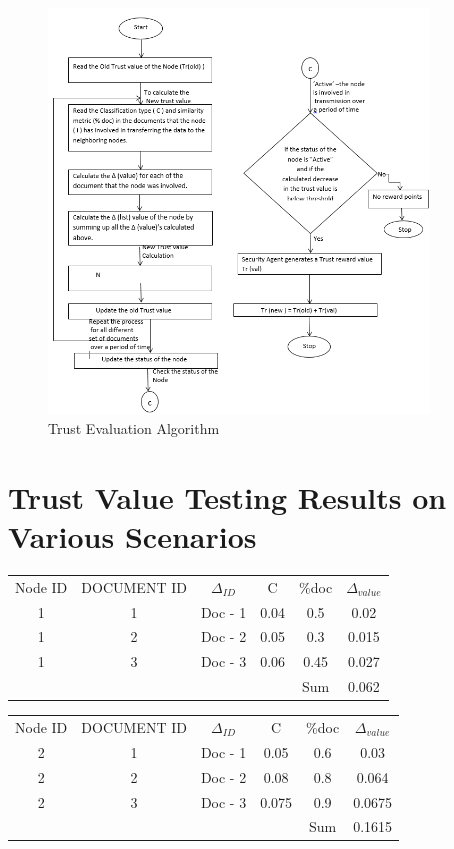 \begin{figure}[h!]
    \label{fig:TrustAlgorithm}
    \begin{center}
        \includegraphics[width=0.90\textwidth]{Figures/Trust_Algorithm.PNG}
        \caption{Trust Evaluation Algorithm}
    \end{center}
\end{figure}
  
\section{Trust Value Testing Results on Various Scenarios}
\begin{tabular}{c c c c c c}
    Node ID	& DOCUMENT ID	& \( \Delta_{ID} \) 	 & C	& \%doc	& \( \Delta_{value} \) \\
1        & 1	&  Doc - 1      & 0.04       & 0.5	& 0.02 \\
1        & 2	&  Doc - 2      & 0.05       & 0.3	& 0.015 \\
1        & 3	&  Doc - 3      & 0.06       & 0.45	& 0.027 \\
         &		&	 	        &            & Sum	& 0.062
\end{tabular}

\begin{tabular}{c c c c c c}
Node ID &	DOCUMENT ID	&  \( \Delta_{ID} \)         & C	& \%doc& \( \Delta_{value} \) \\
2        &1	  & Doc - 1         & 0.05       & 0.6	& 0.03 \\
2        &2	  & Doc - 2         & 0.08       & 0.8	& 0.064 \\
2        &3	  & Doc - 3         & 0.075      & 0.9	& 0.0675 \\
	     &	  &    	            &            &Sum	& 0.1615
 \end{tabular}

